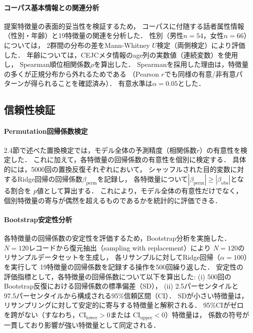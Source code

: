 \documentclass[dvipdfmx,11pt,a4paper]{bxjsarticle}
\renewcommand{\_}{\paperorigunderscore\allowbreak}%
\begin{document}
\paragraph{コーパス基本情報との関連分析}
提案特徴量の表面的妥当性を検証するため，
コーパスに付随する話者属性情報（性別・年齢）と19特徴量の関連を分析した．
性別（男性$n = 54$，女性$n = 66$）については，
2群間の分布の差をMann-Whitney $U$検定（両側検定）により評価した．
年齢については，CEJCメタ情報のage列の実数値（連続変数）を使用し，
Spearman順位相関係数$\rho$を算出した．
Spearmanを採用した理由は，特徴量の多くが正規分布から外れるためである
（Pearson $r$でも同様の有意/非有意パターンが得られることを確認済み）．
有意水準は$\alpha = 0.05$とした．

\subsection{信頼性検証}
\label{sec:reliability}

\paragraph{Permutation回帰係数検定}
2.4節で述べた置換検定では，モデル全体の予測精度（相関係数$r$）の有意性を検定した．
これに加えて，各特徴量の回帰係数の有意性を個別に検定する．
具体的には，5000回の置換反復それぞれにおいて，
シャッフルされた目的変数に対するRidge回帰の回帰係数$\beta_{\text{perm}}$を記録し，
各特徴量について$|\beta_{\text{perm}}| \geq |\beta_{\text{obs}}|$となる割合を
$p$値として算出する．
これにより，モデル全体の有意性だけでなく，
個別特徴量の寄与が偶然を超えるものであるかを統計的に評価できる．

\paragraph{Bootstrap安定性分析}
各特徴量の回帰係数の安定性を評価するため，Bootstrap分析を実施した．
$N = 120$レコードから復元抽出（sampling with replacement）により
$N = 120$のリサンプルデータセットを生成し，
各リサンプルに対してRidge回帰（$\alpha = 100$）を実行して
19特徴量の回帰係数を記録する操作を500回繰り返した．
安定性の評価指標として，各特徴量の回帰係数について以下を算出した:
(i) 500回のBootstrap反復における回帰係数の標準偏差（SD），
(ii) 2.5パーセンタイルと97.5パーセンタイルから構成される95\%信頼区間（CI）．
SDが小さい特徴量は，リサンプリングに対して安定的に寄与する特徴量と解釈される．
95\%CIがゼロを跨がない（すなわち，$\text{CI}_{\text{lower}} > 0$または
$\text{CI}_{\text{upper}} < 0$）特徴量は，
係数の符号が一貫しており影響が強い特徴量として同定される．
\end{document}
